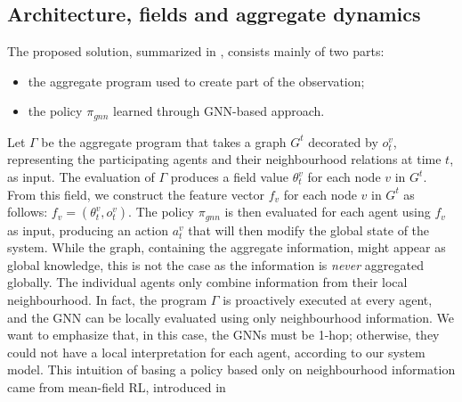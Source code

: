 \subsection{Architecture, fields and aggregate dynamics}
The proposed solution, summarized in , consists mainly of two parts:
\begin{itemize}
  \item the aggregate program used to create part of the observation; 
  \item the policy $\pi_{gnn}$ learned through \ac{GNN}-based approach.
\end{itemize} 
%
Let $\Gamma$ be the aggregate program that takes a graph $G^t$ decorated by $o^v_t$, 
 representing the participating agents and their neighbourhood relations at time $t$, as input. 
%
The evaluation of $\Gamma$ produces a field value $\theta^v_t$ for each node $v$ in $G^t$. 
From this field, we construct the feature vector $f_v$ for each node $v$ in $G^t$ as follows:
 $f_v = (\theta^v_t, o^v_t)$.
%
The policy $\pi_{gnn}$ is then evaluated for each agent using $f_v$ as input, 
 producing an action $a^v_t$ that will then modify the global state of the system.
%
While the graph, containing the aggregate information, 
 might appear as global knowledge, 
 this is not the case as the information is \emph{never} aggregated globally. 
The individual agents only combine information from their local neighbourhood.
%
In fact, the program $\Gamma$ is proactively executed at every agent, 
and the \ac{GNN} can be locally evaluated using only neighbourhood information. 
%
We want to emphasize that, in this case, the \acp{GNN} must be 1-hop; 
otherwise, they could not have a local interpretation for each agent, according to our system model.
%
This intuition of basing a policy based only on neighbourhood information came from mean-field RL, introduced in 

